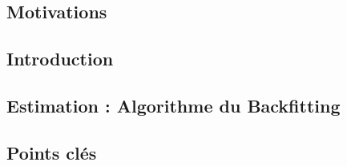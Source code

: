 {
    \subsection{Motivations}
    {
        
    }
    \subsection{Introduction}
    {
        
    }
    \subsection{Estimation : Algorithme du Backfitting}
    {
        
    }
    \subsection{Points clés}
}
